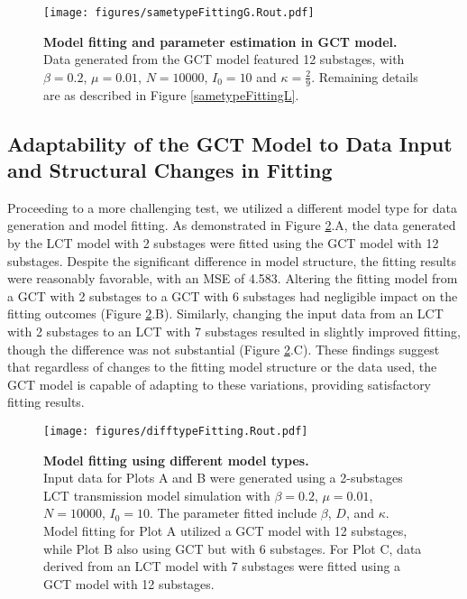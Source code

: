 \documentclass[12pt]{article}
\begin{document}
\begin{figure}[h!]
    \centering
    \texttt{[image: figures/sametypeFittingG.Rout.pdf]}
    \caption{\textbf{Model fitting and parameter estimation in GCT model.} \\ Data generated from the GCT model featured 12 substages, with $\beta=0.2$, $\mu=0.01$, $N=10000$, $I_0=10$ and $\kappa=\frac{2}{9}$. Remaining details are as described in Figure \ref{sametypeFittingL}.}
    \label{sametypeFittingG}
\end{figure}


\subsection{Adaptability of the GCT Model to Data Input and Structural Changes in Fitting}
Proceeding to a more challenging test, we utilized a different model type for data generation and model fitting. As demonstrated in Figure \ref{difftypeFitting}.A, the data generated by the LCT model with 2 substages were fitted using the GCT model with 12 substages. Despite the significant difference in model structure, the fitting results were reasonably favorable, with an MSE of 4.583. Altering the fitting model from a GCT with 2 substages to a GCT with 6 substages had negligible impact on the fitting outcomes (Figure \ref{difftypeFitting}.B). Similarly, changing the input data from an LCT with 2 substages to an LCT with 7 substages resulted in slightly improved fitting, though the difference was not substantial (Figure \ref{difftypeFitting}.C). These findings suggest that regardless of changes to the fitting model structure or the data used, the GCT model is capable of adapting to these variations, providing satisfactory fitting results.

\begin{figure}[h]
    \centering
    \texttt{[image: figures/difftypeFitting.Rout.pdf]}
    \caption{\textbf{Model fitting using different model types.} \\  Input data for Plots A and B were generated using a 2-substages LCT transmission model simulation with $\beta=0.2$, $\mu=0.01$, $N=10000$, $I_0=10$. The parameter fitted include $\beta$, $D$, and $\kappa$. Model fitting for Plot A utilized a GCT model with 12 substages, while Plot B also using GCT but with 6 substages. For Plot C, data derived from an LCT model with 7 substages were fitted using a GCT model with 12 substages.}
    \label{difftypeFitting}
\end{figure}
\end{document}
